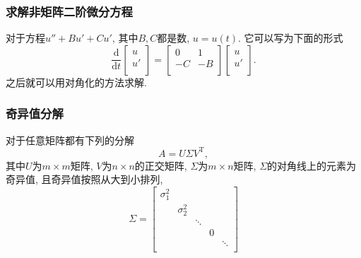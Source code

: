 \subsubsection{求解非矩阵二阶微分方程}
对于方程$u'' + B u' + C u'$, 其中$B, C$都是数, $u= u\left( t \right) $.
它可以写为下面的形式
\begin{equation}
    \frac{\mathrm{d}}{\mathrm{d} t} \begin{bmatrix}
     u\\
     u'\\
    \end{bmatrix}
    =
    \begin{bmatrix}
     0 & 1\\
     -C & -B\\
    \end{bmatrix}
    \begin{bmatrix}
     u\\
     u'\\
    \end{bmatrix}.
\end{equation}
之后就可以用对角化的方法求解.

\subsubsection{奇异值分解}
对于任意矩阵都有下列的分解
\begin{equation}
    A = U \Sigma V^{\mathrm{T}} ,
\end{equation}
其中$U$为$m \times m$矩阵, $V$为$n \times n$的正交矩阵, $\Sigma$为$m \times n$矩阵, $\Sigma$的对角线上的元素为奇异值, 且奇异值按照从大到小排列, 
\begin{equation}
   \Sigma = 
   \begin{bmatrix}
    \sigma_1^{2} &  &  &  & \\
     & \sigma_2^{2} &  &  & \\
     &  & \ddots &  & \\
     &  &  & 0 & \\
     &  &  &  & \ddots\\
   \end{bmatrix}
\end{equation}



